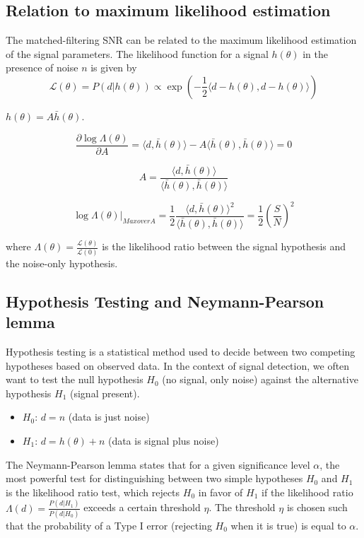 \documentclass[12pt, a4paper]{article}
\theoremstyle{plain} %
\theoremstyle{definition} %
\begin{document}
\subsection*{Relation to maximum likelihood estimation}
The matched-filtering SNR can be related to the maximum likelihood estimation of the signal parameters. The likelihood function for a signal $h(\theta)$ in the presence of noise $n$ is given by
\begin{equation}
    \mathcal{L}(\theta) = P(d|h(\theta)) \propto \exp\left(-\frac{1}{2} \langle d - h(\theta), d - h(\theta) \rangle\right)
\end{equation}

$h(\theta) = A \bar{h}(\theta)$. 

\[
    \frac{\partial \log \Lambda(\theta)}{\partial A}
    = \langle d, \bar{h}(\theta) \rangle - A \langle \bar{h}(\theta), \bar{h}(\theta) \rangle = 0
    \]

\[ A = \frac{\langle d, \bar{h}(\theta) \rangle}{\langle \bar{h}(\theta), \bar{h}(\theta) \rangle} \]

\[ \log \Lambda(\theta)|_{Max over A} = \frac{1}{2} \frac{\langle d, \bar{h}(\theta) \rangle^2}{\langle \bar{h}(\theta), \bar{h}(\theta) \rangle} = \frac{1}{2} \left( \frac{S}{N} \right)^2    \]

where $\Lambda(\theta) = \frac{\mathcal{L}(\theta)}{\mathcal{L}(0)}$ is the likelihood ratio between the signal hypothesis and the noise-only hypothesis.


\subsection*{Hypothesis Testing and Neymann-Pearson lemma}
Hypothesis testing is a statistical method used to decide between two competing hypotheses based on observed data. In the context of signal detection, we often want to test the null hypothesis $H_0$ (no signal, only noise) against the alternative hypothesis $H_1$ (signal present).

\begin{itemize}
    \item $H_0$: $d = n$ (data is just noise)
    \item $H_1$: $d = h(\theta) + n$ (data is signal plus noise)
\end{itemize}

The Neymann-Pearson lemma states that for a given significance level $\alpha$, the most powerful test for distinguishing between two simple hypotheses $H_0$ and $H_1$ is the likelihood ratio test, which rejects $H_0$ in favor of $H_1$ if the likelihood ratio $\Lambda(d) = \frac{P(d|H_1)}{P(d|H_0)}$ exceeds a certain threshold $\eta$. The threshold $\eta$ is chosen such that the probability of a Type I error (rejecting $H_0$ when it is true) is equal to $\alpha$.
\end{document}
